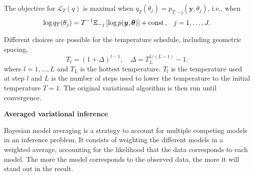 \documentclass[final]{beamer}
\DeclareMathOperator*{\const}{{\rm const}}
\begin{document}
\begin{multicols*}{3}
The objective for $\mathcal{L}_T(q)$ is maximal when $q_T(\theta_j) = p_{T,-j}(\boldsymbol{y},\theta_j)$, i.e., when
\begin{equation*}
\log q_T(\theta_j) = T^{-1} \mathbb{E}_{-j}\left[\log p(\boldsymbol{y}, \boldsymbol{\theta})\right] + \const\text{,}\quad j=1,\dots,J.
\end{equation*}

Different choices are possible for the temperature schedule, including geometric spacing,
\begin{equation*}
T_l = (1 + \Delta)^{l-1},\quad \Delta = T_L^{1/(L-1)}-1.
\end{equation*}
where $l = 1,\dots,L$ and $T_L$ is the hottest temperature. $T_l$ is the temperature used at step $l$ and $L$ is the number of steps used to lower the temperature to the initial temperature $T = 1$. The original variational algorithm is then run until convergence.

\vspace{1em}

\textbf{\large Averaged variational inference}

\vspace{1em}
Bayesian model averaging is a strategy to account for multiple competing models in an inference problem. It consists of weighting the different models in a weighted average, accounting for the likelihood that the data corresponds to each model. The more the model corresponds to the observed data, the more it will stand out in the result.


\end{multicols*}
\end{document}
